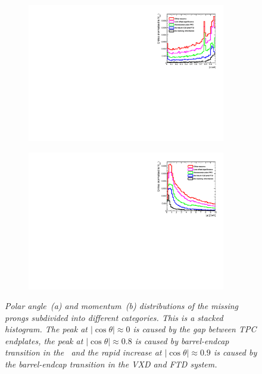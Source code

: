 \begin{figure}[h]
\centering
\begin{subfigure}{0.5\textwidth}
    \includegraphics[width=0.95\textwidth]{ILD/plots/missed-tracks.pdf}
\caption{\label{fig:MissingTracks_cos_3} }
\end{subfigure}%
  \begin{subfigure}{0.5\textwidth}
\centering
    \includegraphics[width=0.95\textwidth]{ILD/plots/missed-momentum.pdf}
\caption{\label{fig:MissingTracks_p_3} }
\end{subfigure}
    \caption{\sl Polar angle~(a) and momentum~(b) distributions of the missing prongs subdivided into different categories. This is a stacked histogram. The peak at $|\cos\theta| \approx 0 $ is caused by the gap between TPC endplates, the peak at  $|\cos\theta| \approx 0.8$ is caused by barrel-endcap transition in the \ecal\ and the rapid increase at $|\cos\theta| \approx 0.9$ is caused by the barrel-endcap transition in the VXD and FTD system. }
    \label{fig:MissingTracks_3}
\end{figure}

